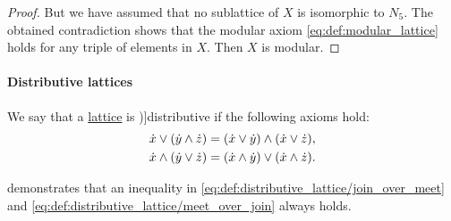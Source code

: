 \begin{proof}
  But we have assumed that no sublattice of \( X \) is isomorphic to \( N_5 \). The obtained contradiction shows that the modular axiom \eqref{eq:def:modular_lattice} holds for any triple of elements in \( X \). Then \( X \) is modular.
\end{proof}

\paragraph{Distributive lattices}

\begin{definition}\label{def:distributive_lattice}
  We say that a \hyperref[def:lattice]{lattice} is \term[ru=дистрибутивная (решётка) (\cite[def. 4.7]{Гуров2013Решётки})]{distributive} if the following axioms hold:
  \begin{align}
    {\dot{x}} \vee ({\dot{y}} \wedge {\dot{z}}) &= ({\dot{x}} \vee {\dot{y}}) \wedge ({\dot{x}} \vee {\dot{z}}), \label{eq:def:distributive_lattice/join_over_meet} \\
    {\dot{x}} \wedge ({\dot{y}} \vee {\dot{z}}) &= ({\dot{x}} \wedge {\dot{y}}) \vee ({\dot{x}} \wedge {\dot{z}}). \label{eq:def:distributive_lattice/meet_over_join}
  \end{align}
\end{definition}
\begin{comments}
  \item {} demonstrates that an inequality in \eqref{eq:def:distributive_lattice/join_over_meet} and \eqref{eq:def:distributive_lattice/meet_over_join} always holds.
\end{comments}

